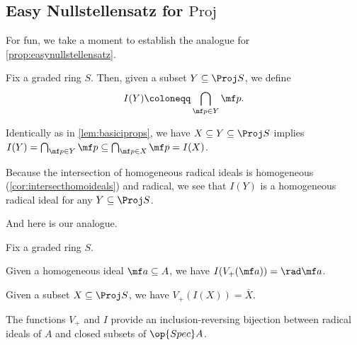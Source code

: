 \documentclass[../notes.tex]{subfiles}
\begin{document}
\subsection{Easy Nullstellensatz for \texorpdfstring{$\mathrm{Proj}$}{\textrm{Proj}}}
For fun, we take a moment to establish the analogue for \autoref{prop:easynullstellensatz}.
\begin{definition}
	Fix a graded ring $S$. Then, given a subset $Y\subseteq\Proj S$, we define
	\[I(Y)\coloneqq\bigcap_{\mf p\in Y}\mf p.\]
\end{definition}
\begin{remark} \label{rem:ireversecontain}
	Identically as in \autoref{lem:basiciprops}, we have $X\subseteq Y\subseteq\Proj S$ implies $I(Y)=\bigcap_{\mf p\in Y}\mf p\subseteq\bigcap_{\mf p\in X}\mf p=I(X)$.
\end{remark}
\begin{remark} \label{rem:iisradhomo}
	Because the intersection of homogeneous radical ideals is homogeneous (\autoref{cor:intersecthomoideals}) and radical, we see that $I(Y)$ is a homogeneous radical ideal for any $Y\subseteq\Proj S$.
\end{remark}
And here is our analogue.
\begin{proposition}
	Fix a graded ring $S$.
	\begin{listalph}
		\item Given a homogeneous ideal $\mf a\subseteq A$, we have $I(V_+(\mf a))=\rad\mf a$.
		\item Given a subset $X\subseteq\Proj S$, we have $V_+(I(X))=\overline X$.
		\item The functions $V_+$ and $I$ provide an inclusion-reversing bijection between radical ideals of $A$ and closed subsets of $\op{Spec}A$.
	\end{listalph}
\end{proposition}
\end{document}
